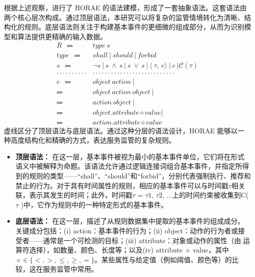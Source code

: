 根据上述观察，进行了 HORAE 的语法建模，形成了一套抽象语法。这套语法由两个核心层次构成。通过顶层语法，本研究可以将复杂的监管情境转化为清晰、结构化的规则。底层语法则关注于构建基本事件的更细微的组成部分，从而为识别模型和算法提供更精确的输入数据。
\begin{align*}
    R \ \  \Coloneqq \ \  & type~s \tag{typed rule}\\
    type \ \  \Coloneqq \ \  & shall~|~should~|~forbid \tag{predefined types}\\
    s \ \  \Coloneqq \ \  &  \neg s~|~s~ \land~ s ~|~s~ \lor~ s ~|~
    \langle~\tau,~e \rangle~|~e~|\mathcal{C}(\tau) \tag{statement}\\
    \cdot \cdot \cdot \cdot\cdot\cdot\cdot\cdot\cdot\cdot & \cdot\cdot\cdot\cdot\cdot\cdot\cdot\cdot\cdot\cdot\cdot\cdot\cdot\cdot\cdot\cdot\cdot\cdot \cdot \cdot \cdot \cdot \cdot \cdot \cdot \cdot\cdot\\
    e \ \  \Coloneqq \ \  & object~action~| \tag{patterned event}\\
    \Coloneqq \ \  & object~action~object~|\\
    \Coloneqq \ \  & action~object~|\\
    \Coloneqq \ \  & object. attribute \diamond value|\\
    \Coloneqq \ \  & action. attribute \diamond value
\end{align*}
虚线区分了顶层语法与底层语法。通过这种分层的语法设计，HORAE 能够以一种高度结构化和精确的方式，表达服务监管的复杂规则。



\begin{itemize}
    \item \textbf{顶层语法：} 在这一层，基本事件被视为最小的基本事件单位，它们将在形式语义中被解释为命题。该语法允许通过逻辑连接词组合基本事件，并指定所得到的规则的类型——“shall”、“should”和“forbid”，分别代表强制执行、推荐和禁止的行为。对于具有时间属性的规则，相应的基本事件可以与时间戳$\tau$相关联，表示其发生的时间；此外，时间戳$\tau$ = {$\tau1$, $\tau2$, ...}上的时间约束被收集到C($\tau$ )中，它作为规则中的一种特定形式的基本事件。
    \item \textbf{底层语法：} 在这一层，描述了从规则数据集中提取的基本事件的组成成分。关键成分包括：(i) action：基本事件的行为；(ii) object：动作的行为者或接受者——通常是一个可检测的目标；(iii) attribute：对象或动作的属性（由.运算符选择），如数量、颜色、长度等；以及(iv) attribute $\diamond$ value，其中$\diamond \in \{<, >, \leq, \geq, =\}$。某些属性与给定值（例如阈值、颜色等）的比较，这在服务监管中常用。
\end{itemize}

